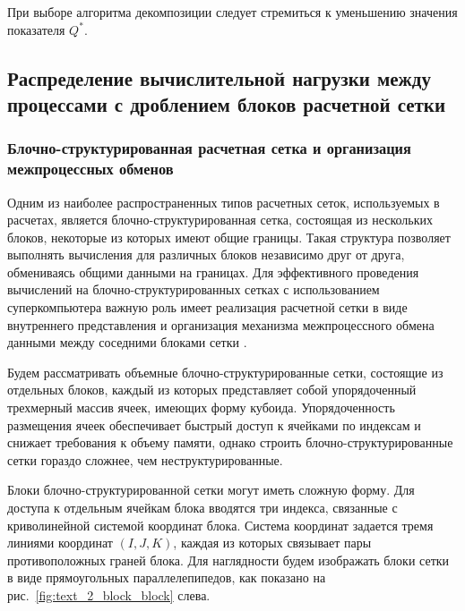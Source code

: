 При выборе алгоритма декомпозиции следует стремиться к уменьшению значения показателя $Q^{*}$.


\subsection{Распределение вычислительной нагрузки между \mbox{процессами} с дроблением блоков расчетной сетки}

\subsubsection{Блочно-структурированная расчетная сетка и организация межпроцессных обменов}\label{sec:par_block_struct_mesh}

Одним из наиболее распространенных типов расчетных сеток, используемых в расчетах, является блочно-структурированная сетка, состоящая из нескольких блоков, некоторые из которых имеют общие границы.
Такая структура позволяет выполнять вычисления для различных блоков независимо друг от друга, обмениваясь общими данными на границах.
Для эффективного проведения вычислений на блочно-структурированных сетках с использованием суперкомпьютера важную роль имеет реализация расчетной сетки в виде внутреннего представления и организация механизма межпроцессного обмена данными между соседними блоками сетки \cite{Rybakov2017Mesh}.

Будем рассматривать объемные блочно-структурированные сетки, состоящие из отдельных блоков, каждый из которых представляет собой упорядоченный трехмерный массив ячеек, имеющих форму кубоида.
Упорядоченность размещения ячеек обеспечивает быстрый доступ к ячейками по индексам и снижает требования к объему памяти, однако строить блочно-структурированные сетки гораздо сложнее, чем неструктурированные.

Блоки блочно-структурированной сетки могут иметь сложную форму.
Для доступа к отдельным ячейкам блока вводятся три индекса, связанные с криволинейной системой координат блока.
Система координат задается тремя линиями координат $(I, J, K)$, каждая из которых связывает пары противоположных граней блока.
Для наглядности будем изображать блоки сетки в виде прямоугольных параллелепипедов, как показано на рис.~\ref{fig:text_2_block_block} слева.

